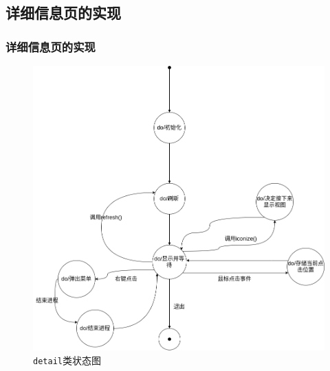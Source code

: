 \documentclass{beamer}
\newcommand\code[1]{\texttt{#1}}
\begin{document}
\begin{frame}
    
{
    \ttfamily
    
}
\end{frame}

\subsection{详细信息页的实现}
\begin{frame}
    \frametitle{详细信息页的实现}
    \begin{figure}
        \centering
        \includegraphics[scale=0.23]{../dia/detail.png}
        \caption{\code{detail}类状态图}
    \end{figure}
\end{frame}
\end{document}
